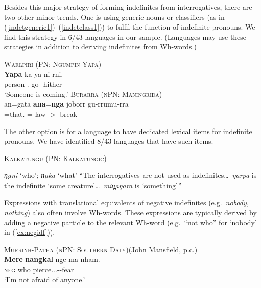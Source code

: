 \documentclass[12pt,egregdoesnotlikesansseriftitles]{scrartcl}
\begin{document}
Besides this major strategy of forming indefinites from interrogatives, there are two other minor trends. One is using generic nouns or classifiers (as in (\ref{indetgeneric1})--(\ref{indetclass1})) to fulfil the function of indefinite pronouns. We find this strategy in 6/43 languages in our sample. (Languages may use these strategies in addition to deriving indefinites from Wh-words.)
\begin{exe}
  \ex \textsc{Warlpiri (PN: Ngumpin-Yapa)} \hfill \citep{wdp}\\
  \gll \textbf{Yapa} ka ya-ni-rni.\\
  person \Aux.\Prs{} go-\Np-hither\\
  \glt `Someone is coming.' \label{indetgeneric1}
  \ex\label{indetclass1} \textsc{Burarra (nPN: Maningrida)}\hfill {}\\
  {\gll an=gata    \textbf{ana}=\textbf{nga}            joborr    gu-rrumu-rra\\
  \Third\Min=that.\Rcgn{}   \Third\Min\Hum=\Indet{}   law     \Third\Min$>$\Third\Min-break-\Pc\\}
\end{exe}
  
The other option is for a language to have dedicated lexical items for indefinite pronouns. We have identified 8/43 languages that have such items.
\begin{exe}
  \ex \textsc{Kalkatungu (PN: Kalkatungic)}\hfill {}
  \begin{xlist}
    \ex \textit{\charis n̪ani} `who'; \textit{\charis n̪aka} `what'
    \ex ``The interrogatives are not used as indefinites\ldots\ \textit{\charis ŋarpa} is the indefinite `some creature'\ldots\ \textit{\charis min̪aŋara} is `something'\thinspace''
  \end{xlist}
\end{exe}

Expressions with translational equivalents of negative indefinites (e.g.\ \textit{nobody, nothing})  also often involve Wh-words. These expressions are typically derived by adding a negative particle to the relevant Wh-word (e.g.\ ``not who'' for `nobody' in (\ref{ex:negidf})).

\begin{exe}
  \ex\label{ex:negidf} \textsc{Murrinh-Patha (nPN: Southern Daly)}\hfill (John Mansfield, p.c.)\\
  \gll \textbf{Mere} \textbf{nangkal} nge-ma-nham.\\
  \textsc{neg} who pierce.\Rr.\Fsg.\Irr-\Appl-fear\\
  \glt `I'm not afraid of anyone.' %
\end{exe}
\end{document}
